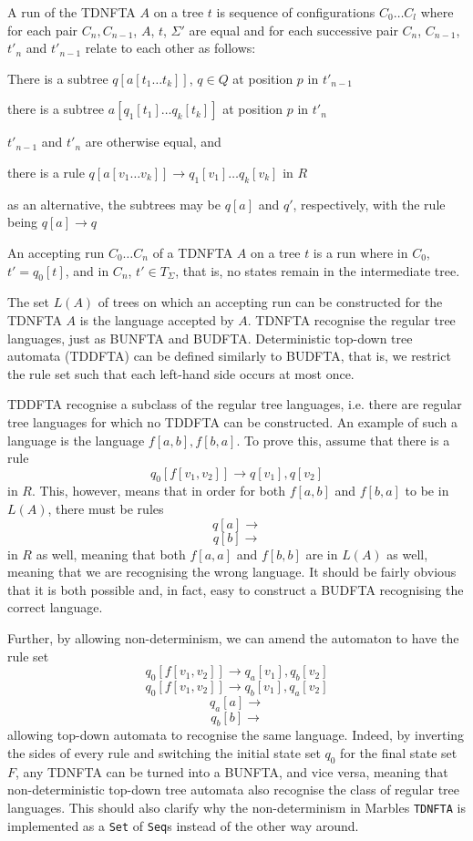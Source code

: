 A run of the TDNFTA $A$ on a tree $t$ is sequence of configurations $C_0
\ldots C_l$ where for each pair $C_n, C_{n-1}$, $A$, $t$, $\Sigma'$ are
equal and for each successive pair $C_n$, $C_{n-1}$, $t'_n$ and $t'_{n-1}$
relate to each other as follows: 
\begin{compactitem}
\item There is a subtree $q[a[t_1 \ldots t_k]]$, $q \in Q$ at position $p$
in $t'_{n-1}$
\item there is a subtree $a[q_1[t_1] \ldots q_k[t_k]]$ at position $p$ in
$t'_{n}$
\item $t'_{n-1}$ and $t'_n$ are otherwise equal, and
\item there is a rule $q[a[v_1 \ldots v_k]] \rightarrow q_1[v_1] \ldots
q_k[v_k]$ in $R$ 
\item as an alternative, the subtrees may be $q[a]$ and $q'$, respectively,
with the rule being $q[a] \rightarrow q$
\end{compactitem}
\vspace{0.5cm}

An accepting run ${C_0 \ldots C_n}$ of a TDNFTA $A$ on a tree $t$ is a run
where in $C_0$, $t' = q_0[t]$, and in $C_n$, $t' \in T_\Sigma$, that is, no
states remain in the intermediate tree.

The set $L(A)$ of trees on which an accepting run can be constructed for the
TDNFTA $A$ is the language accepted by $A$. TDNFTA recognise the regular
tree languages, just as BUNFTA and BUDFTA. Deterministic top-down tree
automata (TDDFTA) can be defined similarly to BUDFTA, that is, we restrict
the rule set such that each left-hand side occurs at most once.

TDDFTA recognise a subclass of the regular tree languages, i.e. there are
regular tree languages for which no TDDFTA can be constructed. An example
of such a language is the language ${f[a,b], f[b,a]}$. To prove this,
assume that there is a rule $$q_0[f[v_1,v_2]] \rightarrow q[v_1], q[v_2]$$
in $R$. This, however, means that in order for both $f[a,b]$ and $f[b,a]$
to be in $L(A)$, there must be rules
$$q[a] \rightarrow $$
$$q[b] \rightarrow $$
in $R$ as well, meaning that both $f[a,a]$ and $f[b,b]$ are in $L(A)$ as
well, meaning that we are recognising the wrong language. It should be
fairly obvious that it is both possible and, in fact, easy to construct a
BUDFTA recognising the correct language.

Further, by allowing non-determinism, we can amend the automaton to have
the rule set
$$q_0[f[v_1,v_2]] \rightarrow q_a[v_1], q_b[v_2]$$
$$q_0[f[v_1,v_2]] \rightarrow q_b[v_1], q_a[v_2]$$
$$q_a[a] \rightarrow $$
$$q_b[b] \rightarrow $$
allowing top-down automata to recognise the same language. Indeed, by
inverting the sides of every rule and switching the initial state set $q_0$
for the final state set $F$, any TDNFTA can be turned into a BUNFTA, and
vice versa, meaning that non-deterministic top-down tree automata also
recognise the class of regular tree languages. This should also clarify why
the non-determinism in Marbles \texttt{TDNFTA} is implemented as a
\texttt{Set} of \texttt{Seq}s instead of the other way around.

